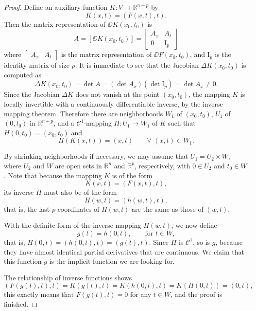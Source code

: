 \documentclass[11pt]{article}
\begin{document}
\begin{proof}
  Define an auxiliary function $K: V \to \mathbb{R}^{n+p}$ by
  \[
    K(x,t) = \left( F(x,t), t \right).
  \]
  Then the matrix representation of $\DD K(x_0,t_0)$ is
  \[
    A = [ \DD K(x_0, t_0) ] = 
    \begin{bmatrix}
      A_x & A_t \\ 0 & {\mathrm I}_p
    \end{bmatrix}
  \]
  where $\begin{bmatrix} A_x & A_t \end{bmatrix}$ is the matrix representation of $\DD F(x_0, t_0)$, and $\mathrm I_p$ is the identity matrix of size $p$.
  It is immediate to see that the Jacobian $\Delta K(x_0,t_0)$ is computed as
  \[
    \Delta K(x_0,t_0) = \det A = (\det A_x)(\det \mathrm I_p) = \det A_x \ne 0.
  \]
  Since the Jacobian $\Delta K$ does not vanish at the point $(x_0, t_0)$, the mapping $K$ is locally invertible with a continuously differentiable inverse, by the inverse mapping theorem.
  Therefore there are neighborhoods $W_1$ of $(x_0, t_0)$, $U_1$ of $(0,t_0)$ in $\mathbb{R}^{n+p}$, and a $\mathcal{C}^1$-mapping $H : U_1 \to W_1$ of $K$ such that $H(0,t_0) = (x_0, t_0)$ and
  \[
    H(K(x,t)) = (x,t) \qquad \forall\,\, (x,t) \in W_1.
  \]
  
  By shrinking neighborhoods if necessary, we may assume that $U_1 = U_2 \times W$, where $U_2$ and $W$ are open sets in $\mathbb{R}^n$ and $\mathbb{R}^p$, respectively, with $0 \in U_2$ and $t_0 \in W$.
  Note that because the mapping $K$ is of the form
  \[
    K(x,t) = \left( F(x,t), t \right),
  \]
  its inverse $H$ must also be of the form
  \[
    H(w,t) = \left( h(w,t), t \right),
  \]
  that is, the last $p$ coordinates of $H(w,t)$ are the same as those of $(w,t)$.

  With the definite form of the inverse mapping $H(w,t)$, we now define
  \[
    g(t) = h(0,t), \qquad \text{for $t \in W$},
  \]
  that is, $H(0,t) = (h(0,t),t) = (g(t),t)$.
  Since $H$ is $\mathcal{C}^1$, so is $g$, because they have almost identical partial derivatives that are continuous.  We claim that this function $g$ is the implicit function we are looking for.

  The relationship of inverse functions shows
  \[
    \left( F(g(t),t), t \right) = K\left( g(t), t \right) = K \left( h(0,t), t \right) = K\left( H(0,t) \right) = (0,t),
  \]
  this exactly means that $F\left( g(t), t \right) = 0$ for any $t \in W$, and the proof is finished.
\end{proof}
\end{document}

